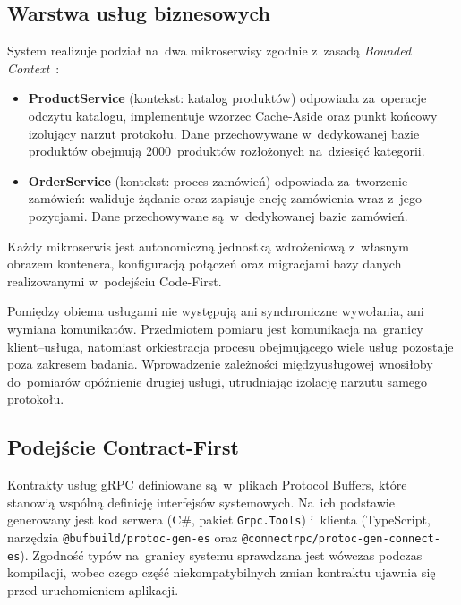 \subsection{Warstwa usług biznesowych}
\label{subsec:WarstwaBiznesowa}

System realizuje podział na~dwa mikroserwisy zgodnie z~zasadą \textit{Bounded Context}~\cite{bib:Evans2003}:

\begin{itemize}
    \item \textbf{ProductService} (kontekst: katalog produktów) odpowiada za~operacje odczytu katalogu, implementuje wzorzec Cache-Aside oraz punkt końcowy izolujący narzut protokołu. Dane przechowywane w~dedykowanej bazie produktów obejmują 2000~produktów rozłożonych na~dziesięć kategorii.
    \item \textbf{OrderService} (kontekst: proces zamówień) odpowiada za~tworzenie
    zamówień: waliduje żądanie oraz zapisuje encję zamówienia wraz z~jego pozycjami. Dane przechowywane są~w~dedykowanej bazie zamówień.
\end{itemize}

Każdy mikroserwis jest autonomiczną jednostką wdrożeniową z~własnym obrazem kontenera, konfiguracją połączeń oraz migracjami bazy danych realizowanymi w~podejściu Code-First.

Pomiędzy obiema usługami nie występują ani synchroniczne wywołania, ani wymiana komunikatów. Przedmiotem pomiaru jest komunikacja na~granicy klient--usługa, natomiast orkiestracja procesu obejmującego wiele usług pozostaje poza zakresem badania. Wprowadzenie zależności międzyusługowej wnosiłoby do~pomiarów opóźnienie drugiej usługi, utrudniając izolację narzutu samego protokołu.

\subsection{Podejście Contract-First}
\label{subsec:ContractFirst}

Kontrakty usług gRPC definiowane są~w~plikach Protocol Buffers, które stanowią wspólną definicję interfejsów systemowych. Na~ich podstawie generowany jest kod serwera (C\#, pakiet \texttt{Grpc.Tools}) i~klienta (TypeScript, narzędzia \texttt{@bufbuild/protoc-gen-es} oraz \texttt{@connectrpc/protoc-gen-connect-es}). Zgodność typów na~granicy systemu sprawdzana jest wówczas podczas kompilacji, wobec czego część niekompatybilnych zmian kontraktu ujawnia się przed uruchomieniem aplikacji.

